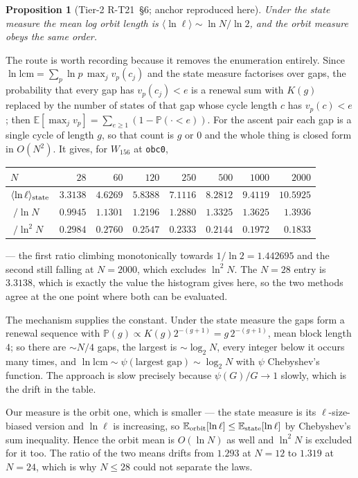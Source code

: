 \documentclass[11pt]{article}
\newcommand{\rt}[1]{\texttt{#1}}
\theoremstyle{plain}
\newtheorem{proposition}{Proposition}
\theoremstyle{remark}
\begin{document}
\begin{proposition}[Tier-2 R-T21~\S6; anchor reproduced here]
\label{prop:logn}
Under the \emph{state} measure the mean log orbit length is
$\langle\ln\ell\rangle \sim \ln N/\ln 2$, and the orbit measure obeys the same
order.
\end{proposition}

\noindent The route is worth recording because it removes the enumeration
entirely. Since $\ln\mathrm{lcm}=\sum_p \ln p\,\max_j v_p(c_j)$ and the state
measure factorises over gaps, the probability that every gap has
$v_p(c_j)<e$ is a renewal sum with $K(g)$ replaced by the number of states of
that gap whose cycle length $c$ has $v_p(c)<e$; then
$\mathbb{E}[\max_j v_p]=\sum_{e\ge1}(1-\mathbb{P}(\cdot<e))$. For the ascent pair
each gap is a single cycle of length $g$, so that count is $g$ or $0$ and the
whole thing is closed form in $O(N^2)$. It gives, for $W_{156}$ at \rt{obc0},
\begin{center}
\small
\begin{tabular}{lrrrrrrr}
\toprule
$N$ & $28$ & $60$ & $120$ & $250$ & $500$ & $1000$ & $2000$\\
\midrule
$\langle\ln\ell\rangle_{\rm state}$ & $3.3138$ & $4.6269$ & $5.8388$ & $7.1116$ & $8.2812$ & $9.4119$ & $10.5925$\\
$\;/\ln N$   & $0.9945$ & $1.1301$ & $1.2196$ & $1.2880$ & $1.3325$ & $1.3625$ & $1.3936$\\
$\;/\ln^2 N$ & $0.2984$ & $0.2760$ & $0.2547$ & $0.2333$ & $0.2144$ & $0.1972$ & $0.1833$\\
\bottomrule
\end{tabular}
\end{center}
--- the first ratio climbing monotonically towards $1/\ln2=1.442695$ and the
second still falling at $N=2000$, which excludes $\ln^2N$. The $N=28$ entry is
$3.3138$, which is exactly the value the histogram gives here, so the two methods
agree at the one point where both can be evaluated.

The mechanism supplies the constant. Under the state measure the gaps form a
renewal sequence with $\mathbb{P}(g)\propto K(g)2^{-(g+1)}=g\,2^{-(g+1)}$, mean
block length $4$; so there are $\sim N/4$ gaps, the largest is $\sim\log_2 N$,
every integer below it occurs many times, and
$\ln\mathrm{lcm}\sim\psi(\text{largest gap})\sim\log_2 N$ with $\psi$ Chebyshev's
function. The approach is slow precisely because $\psi(G)/G\to1$ slowly, which is
the drift in the table.

Our measure is the orbit one, which is smaller --- the state measure is its
$\ell$-size-biased version and $\ln\ell$ is increasing, so
$\mathbb{E}_{\rm orbit}[\ln\ell]\le\mathbb{E}_{\rm state}[\ln\ell]$ by Chebyshev's
sum inequality. Hence the orbit mean is $O(\ln N)$ as well and $\ln^2N$ is
excluded for it too. The ratio of the two means drifts from $1.293$ at $N=12$ to
$1.319$ at $N=24$, which is why $N\le28$ could not separate the laws.
\end{document}
